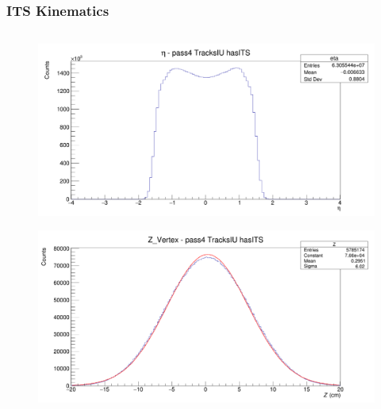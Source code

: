 \documentclass[11pt]{beamer}
\begin{document}
\begin{frame}
    \frametitle{ITS Kinematics}

    \begin{columns}[c]
        \begin{column}{0.5\textwidth}
            \begin{figure}
                \begin{center}
                    \includegraphics[width=\textwidth]{Plots/ITS/eta.png}
                \end{center}
            \end{figure}
            \begin{figure}
                \begin{center}
                    \includegraphics[width=\textwidth]{Plots/ITS/Z.png}
                \end{center}
            \end{figure}
        \end{column}


\end{columns}
\end{frame}
\end{document}
